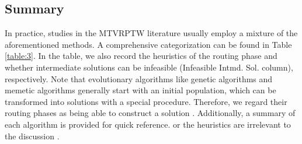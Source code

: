 \subsection{Summary}
In practice, studies in the MTVRPTW literature usually employ a mixture of the aforementioned methods.  A comprehensive categorization can be found in Table \ref{table:3}.  In the table, we also record the heuristics of the routing phase %
and whether intermediate solutions can be infeasible (Infeasible Intmd. Sol. column), respectively.  Note that evolutionary algorithms like genetic algorithms and memetic algorithms generally start with an initial population, which can be transformed into solutions with a special procedure.  Therefore, we regard their routing phases as being able to construct a solution \citep[e.g.,][]{cattaruzza2016multi, zhen2020multi}.  Additionally, a summary of each algorithm is provided for quick reference.   or the heuristics are irrelevant to the discussion \citep[e.g.,][which focuses on a comparison of single-trip and multiple-trip insertion heuristic, and is only applicable for the routing phase]{karoonsoontawong2015efficient}.


